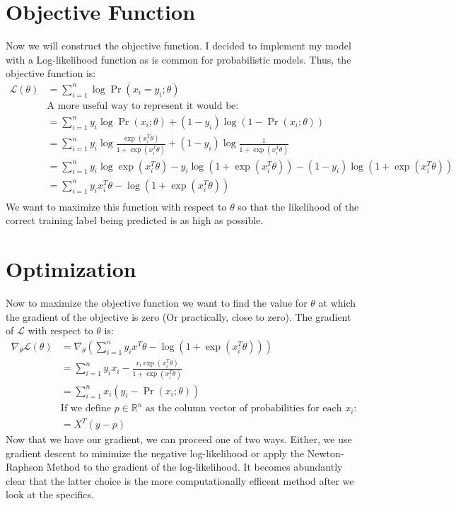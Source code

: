\documentclass[12pt]{article}
\begin{document}
\section*{Objective Function}
Now we will construct the objective function. I decided to implement my model
with a Log-likelihood function as is common for probabilistic models. Thus,
the objective function is:
\begin{align*}
    \mathcal{L}(\theta) &= \displaystyle \sum_{i = 1}^{n} \log\Pr(x_i = y_i; \theta) \\
    &\text{A more useful way to represent it would be:} \\
    &= \displaystyle \sum_{i = 1}^{n} y_i\log\Pr(x_i; \theta) + (1 - y_i)\log(1 - \Pr(x_i; \theta)) \\
    &= \displaystyle \sum_{i = 1}^{n} y_i\log\frac{\exp(x_i^T\theta)}{1 + \exp(x_i^T\theta)} + (1 - y_i)\log\frac{1}{1 + \exp(x_i^T\theta)} \\
    &= \displaystyle \sum_{i = 1}^{n} y_i\log\exp(x_i^T\theta) - y_i\log(1 + \exp(x_i^T\theta)) - (1 - y_i)\log(1 + \exp(x_i^T\theta)) \\
    &= \displaystyle \sum_{i = 1}^{n} y_ix_i^T\theta - \log(1 + \exp(x_i^T\theta)) \\
\end{align*}
We want to maximize this function with respect to $\theta$ so that the
likelihood of the correct training label being predicted is as high as possible.

\section*{Optimization}
Now to maximize the objective function we want to find the value for $\theta$
at which the gradient of the objective is zero (Or practically, close to zero).
The gradient of $\mathcal{L}$ with respect to $\theta$ is:
\begin{align*}
    \nabla_\theta \mathcal{L(\theta)} &= \nabla_\theta(\displaystyle \sum_{i = 1}^{n} y_ix^T\theta - \log(1 + \exp(x_i^T\theta))) \\
    &= \displaystyle \sum_{i = 1}^{n} y_ix_i - \frac{x_i\exp(x_i^T\theta)}{1 + \exp(x_i^T\theta)} \\
    &= \displaystyle \sum_{i = 1}^{n} x_i(y_i - \Pr(x_i; \theta)) \\
    &\text{If we define $p \in \mathbb{R}^n$ as the column vector of probabilities for each $x_i$:} \\
    &= X^T(y - p)
\end{align*}
Now that we have our gradient, we can proceed one of two ways. Either, we use
gradient descent to minimize the negative log-likelihood or apply the Newton-Raphson
Method to the gradient of the log-likelihood. It becomes abundantly clear that 
the latter choice is the more computationally efficent method after we look at the specifics.
\end{document}
